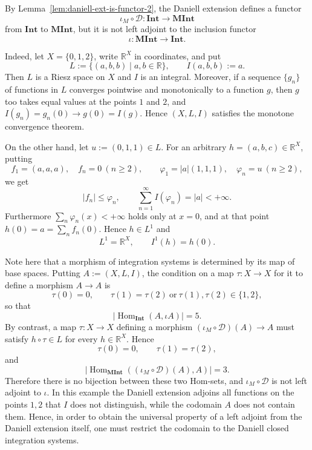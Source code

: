 \begin{remark}\label{rem:D-I-not-left-adjoint}
  By Lemma~\ref{lem:daniell-ext-is-functor-2}, the Daniell extension defines a
  functor
  \[
    \iota_M\circ\mathcal{D}:\mathbf{Int}\to\mathbf{MInt}
  \]
  from $\mathbf{Int}$ to $\mathbf{MInt}$, but it is not left adjoint to the
  inclusion functor
  \[
    \iota:\mathbf{MInt}\to\mathbf{Int} .
  \]

  Indeed, let $X=\{0,1,2\}$, write $\mathbb{R}^X$ in coordinates, and put
  \[
    L:=\{(a,b,b)\mid a,b\in\mathbb{R}\},
    \qquad
    I(a,b,b):=a .
  \]
  Then $L$ is a Riesz space on $X$ and $I$ is an integral. Moreover, if a
  sequence $\{g_n\}$ of functions in $L$ converges pointwise and monotonically to
  a function $g$, then $g$ too takes equal values at the points $1$ and $2$, and
  $I(g_n)=g_n(0)\to g(0)=I(g)$. Hence $(X,L,I)$ satisfies the monotone
  convergence theorem.

  On the other hand, let $u:=(0,1,1)\in L$. For an arbitrary
  $h=(a,b,c)\in\mathbb{R}^X$, putting
  \[
    f_1=(a,a,a),\quad f_n=0\ (n\ge2),
    \qquad
    \varphi_1=|a|(1,1,1),\quad \varphi_n=u\ (n\ge2) ,
  \]
  we get
  \[
    |f_n|\le\varphi_n,
    \qquad
    \sum_{n=1}^{\infty}I(\varphi_n)=|a|<+\infty.
  \]
  Furthermore $\sum_n\varphi_n(x)<+\infty$ holds only at $x=0$, and at that
  point $h(0)=a=\sum_n f_n(0)$. Hence $h\in L^1$ and
  \[
    L^1=\mathbb{R}^X,
    \qquad
    I^1(h)=h(0).
  \]

  Note here that a morphism of integration systems is determined by its map of
  base spaces. Putting $A:=(X,L,I)$, the condition on a map $\tau:X\to X$ for it
  to define a morphism $A\to A$ is
  \[
    \tau(0)=0,
    \qquad
    \tau(1)=\tau(2)\ \text{or}\ \tau(1),\tau(2)\in\{1,2\} ,
  \]
  so that
  \[
    \left|\operatorname{Hom}_{\mathbf{Int}}(A,\iota A)\right|=5.
  \]
  By contrast, a map $\tau:X\to X$ defining a morphism
  $(\iota_M\circ\mathcal{D})(A)\to A$ must satisfy $h\circ\tau\in L$ for every
  $h\in\mathbb{R}^X$. Hence
  \[
    \tau(0)=0,
    \qquad
    \tau(1)=\tau(2),
  \]
  and
  \[
    \left|\operatorname{Hom}_{\mathbf{MInt}}((\iota_M\circ\mathcal{D})(A),A)\right|=3.
  \]
  Therefore there is no bijection between these two Hom-sets, and
  $\iota_M\circ\mathcal{D}$ is not left adjoint to $\iota$. In this example the
  Daniell extension adjoins all functions on the points $1,2$ that $I$ does not
  distinguish, while the codomain $A$ does not contain them. Hence, in order to
  obtain the universal property of a left adjoint from the Daniell extension
  itself, one must restrict the codomain to the Daniell closed integration
  systems.
\end{remark}

